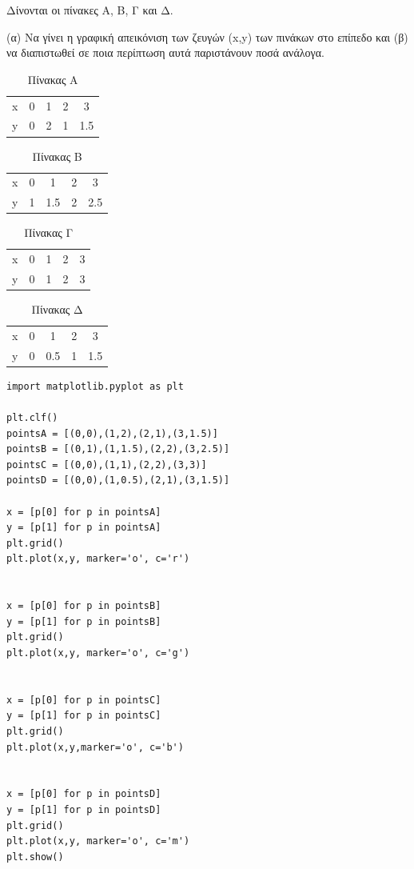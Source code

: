 \begin{exercise}
Δίνονται	οι	 πίνακες	Α,	Β,	 Γ	και	Δ.	

(α)	Να	γίνει	η	γραφική	απεικόνιση	των	ζευγών	(x,y)	των	πινάκων	στο επίπεδο	και	
(β)	να	διαπιστωθεί	σε	ποια	περίπτωση	αυτά	παριστάνουν	ποσά	ανάλογα.   

\begin{table}
\begin{tabular}{|c|c|c|c|c|}
x&0&1&2&3\\
y&0&2&1&1.5\\
\end{tabular}
\caption{Πίνακας Α}
\end{table}

\begin{table}
\begin{tabular}{|c|c|c|c|c|}
x&0&1&2&3\\
y&1&1.5&2&2.5\\
\end{tabular}
\caption{Πίνακας B}
\end{table}

\begin{table}
\begin{tabular}{|c|c|c|c|c|}
x&0&1&2&3\\
y&0&1&2&3\\
\end{tabular}
\caption{Πίνακας Γ}
\end{table}


\begin{table}
\begin{tabular}{|c|c|c|c|c|}
x&0&1&2&3\\
y&0&0.5&1&1.5\\
\end{tabular}
\caption{Πίνακας Δ}
\end{table}
\end{exercise}
\begin{lstlisting}
import matplotlib.pyplot as plt

plt.clf()
pointsA = [(0,0),(1,2),(2,1),(3,1.5)]
pointsB = [(0,1),(1,1.5),(2,2),(3,2.5)]
pointsC = [(0,0),(1,1),(2,2),(3,3)]
pointsD = [(0,0),(1,0.5),(2,1),(3,1.5)]

x = [p[0] for p in pointsA]
y = [p[1] for p in pointsA]
plt.grid()
plt.plot(x,y, marker='o', c='r')


x = [p[0] for p in pointsB]
y = [p[1] for p in pointsB]
plt.grid()
plt.plot(x,y, marker='o', c='g')


x = [p[0] for p in pointsC]
y = [p[1] for p in pointsC]
plt.grid()
plt.plot(x,y,marker='o', c='b')


x = [p[0] for p in pointsD]
y = [p[1] for p in pointsD]
plt.grid()
plt.plot(x,y, marker='o', c='m')
plt.show()
\end{lstlisting}

